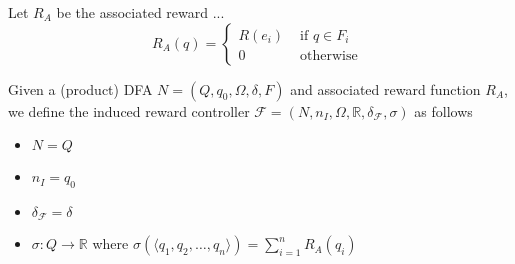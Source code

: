 \begin{definition}
Let $R_A$ be the associated reward ... 
\begin{equation*}
R_A(q) = \begin{cases}
R(e_i) & \text{ if } q\in F_i \\
0 & \text{ otherwise }
\end{cases}
\end{equation*}
\label{d:associated_reward}
\end{definition}


\begin{definition}
Given a (product) DFA $N=(Q,q_0,\Omega,\delta,F)$ and associated reward function $R_A$, we define the induced reward controller $\mathcal{F}=(N,n_I,\Omega, \mathbb{R}, \delta_\mathcal{F},\sigma)$ as follows
\begin{itemize}
\item $N=Q$
\item $n_I=q_0$
\item $\delta_\mathcal{F}=\delta$
\item $\sigma: Q\to\mathbb{R}$ where $\sigma(\langle q_1,q_2,\dots, q_n\rangle) = \sum\limits _{i=1}^n R_A(q_i)$
\end{itemize}
\label{d:reward_controller_regex}
\end{definition}


